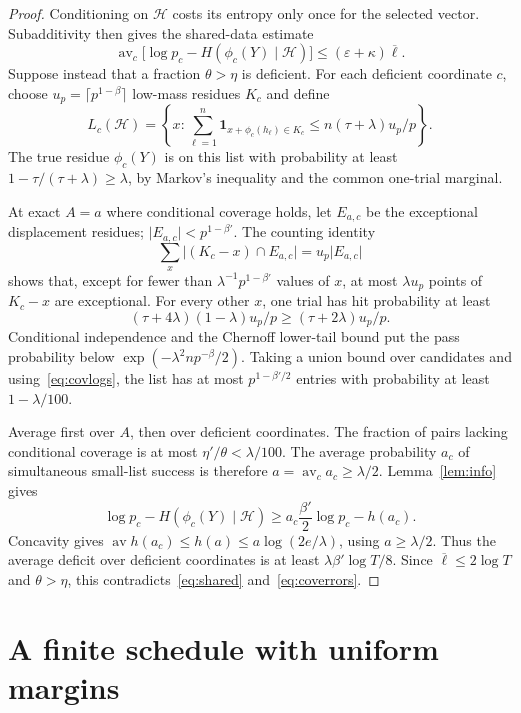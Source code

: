 \documentclass[11pt]{article}
\numberwithin{equation}{section}
\theoremstyle{definition}\newtheorem{definition}[theorem]{Definition}
\theoremstyle{remark}\newtheorem{remark}[theorem]{Remark}
\newcommand{\abs}[1]{\lvert #1\rvert}
\newcommand{\Lb}{\overline{\ell}}
\newcommand{\av}{\operatorname{av}}
\begin{document}
\begin{proof}
Conditioning on $\mathcal H$ costs its entropy only once for the selected vector. Subadditivity then gives the shared-data estimate
\begin{equation}\label{eq:shared}
 \av_c\bigl[\log p_c-H(\phi_c(Y)\mid\mathcal H)\bigr]
 \le(\varepsilon+\kappa)\Lb.
\end{equation}
Suppose instead that a fraction $\theta>\eta$ is deficient. For each deficient coordinate $c$, choose $u_p=\lceil p^{1-\beta}\rceil$ low-mass residues $K_c$ and define
\[
 L_c(\mathcal H)=\left\{x:\sum_{\ell=1}^n
  \mathbf1_{x+\phi_c(h_\ell)\in K_c}
  \le n(\tau+\lambda)u_p/p\right\}.
\]
The true residue $\phi_c(Y)$ is on this list with probability at least
$1-\tau/(\tau+\lambda)\ge\lambda$, by Markov's inequality and the common one-trial marginal.

At exact $A=a$ where conditional coverage holds, let $E_{a,c}$ be the exceptional displacement residues; $\abs{E_{a,c}}<p^{1-\beta'}$. The counting identity
\[
 \sum_x\abs{(K_c-x)\cap E_{a,c}}=u_p\abs{E_{a,c}}
\]
shows that, except for fewer than $\lambda^{-1}p^{1-\beta'}$ values of $x$, at most $\lambda u_p$ points of $K_c-x$ are exceptional. For every other $x$, one trial has hit probability at least
\[
 (\tau+4\lambda)(1-\lambda)u_p/p\ge(\tau+2\lambda)u_p/p.
\]
Conditional independence and the Chernoff lower-tail bound put the pass probability below $\exp(-\lambda^2np^{-\beta}/2)$. Taking a union bound over candidates and using~\eqref{eq:covlogs}, the list has at most $p^{1-\beta'/2}$ entries with probability at least $1-\lambda/100$.

Average first over $A$, then over deficient coordinates. The fraction of pairs lacking conditional coverage is at most $\eta'/\theta<\lambda/100$. The average probability $a_c$ of simultaneous small-list success is therefore $a=\av_c a_c\ge\lambda/2$. Lemma~\ref{lem:info} gives
\[
 \log p_c-H(\phi_c(Y)\mid\mathcal H)
 \ge a_c\frac{\beta'}2\log p_c-h(a_c).
\]
Concavity gives $\av h(a_c)\le h(a)\le a\log(2e/\lambda)$, using $a\ge\lambda/2$. Thus the average deficit over deficient coordinates is at least $\lambda\beta'\log T/8$. Since $\Lb\le2\log T$ and $\theta>\eta$, this contradicts~\eqref{eq:shared} and~\eqref{eq:coverrors}.
\end{proof}

\section{A finite schedule with uniform margins}\label{sec:schedule}
\end{document}
